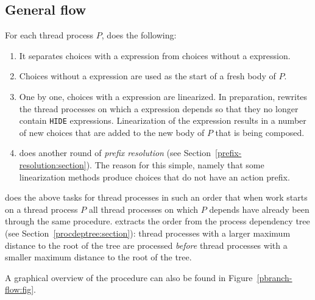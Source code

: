 \subsection{General flow}

For each thread process $P$, \lpeq{} does the following:
\begin{enumerate}[1.]
\item It separates choices with a \pedi{} expression from choices without a \pedi{} expression.
\item Choices without a \pedi{} expression are used as the start of a fresh body of $P$.
\item One by one, choices with a \pedi{} expression are linearized.
In preparation, \lpeq{} rewrites the thread processes on which a \pedi{} expression depends so that they no longer contain \texttt{HIDE} expressions.
Linearization of the \pedi{} expression results in a number of new choices that are added to the new body of $P$ that is being composed.
\item \lpeq{} does another round of \emph{prefix resolution} (see Section~\ref{prefix-resolution:section}).
The reason for this simple, namely that some linearization methods produce choices that do not have an action prefix.
\end{enumerate}

\lpeq{} does the above tasks for thread processes in such an order that when work starts on a thread process $P$ all thread processes on which $P$ depends have already been through the same procedure.
\lpeq{} extracts the order from the process dependency tree (see Section~\ref{procdeptree:section}): thread processes with a larger maximum distance to the root of the tree are processed \emph{before} thread processes with a smaller maximum distance to the root of the tree.

A graphical overview of the procedure can also be found in Figure~\ref{pbranch-flow:fig}.

